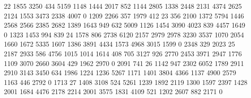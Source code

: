 22	1855	3250	434	5159	1148	1444	2017	852	1144	2805	1338	2448		2131	4374	2625	2124	1553	3473	2338	4007	0	1209	2266	357	1979	412
23	356	2100	1372	5794	1446	2568	2566	2385	2682	1389	1643	949		632	5009	1126	1454	3090	4023	839	4457	1649	0	1323	1453	994	839
24	1578	806	2738	6120	2157	2979	2978	3230	3537	1070	2054	1660		1672	5335	1607	1386	3891	4434	1573	4968	3015	1599	0	2348	329	2023
25	2187	2933	586	4756	1015	1014	1614	408	705	3127	926	2770		2453	3971	2947	1776	1109	3070	2660	3604	429	1962	2970	0	2091	741
26	1142	947	2302	6052	1789	2911	2910	3143	3450	634	1986	1224		1236	5267	1171	1401	3804	4366	1137	4900	2579	1163	446	2792	0	1713
27	1408	3108	524	5261	1239	1892	2119	1300	1597	2397	1428	2001		1684	4476	2178	2214	2001	3575	1831	4109	521	1202	2607	882	2171	0
